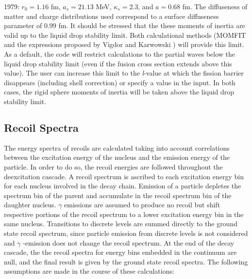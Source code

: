 1979: $r_{0}=1.16$ fm, $a_{s}=21.13$ MeV, $\kappa_{s}=2.3$, and $a=0.68$ fm.
The diffuseness of matter and charge distributions used correspond to a
surface diffuseness parameter of 0.99 fm. It should be stressed that the
these moments of inertia are valid up to the
liquid drop stability limit. Both calculational methods (MOMFIT and the
expressions proposed by Vigdor and Karwowski \cite{VK}) will provide this
limit. As a default, the code will restrict calculations to the partial
waves below the liquid drop stability limit (even if the fusion cross
section extends above this value). The user can increase this limit to the
\emph{l}-value at which the fission barrier disappears (including shell
correction) or specify a value in the input. In both cases, the rigid
sphere moments of inertia will be taken above the liquid drop stability
limit.

\subsection{Recoil Spectra}

The energy spectra of recoils are calculated taking into account correlations
between the excitation energy of the nucleus and the emission energy of the
particle. In order to do so, the recoil energies are followed throughout the
deexcitation cascade. A recoil spectrum is ascribed to each excitation
energy bin for each nucleus involved in the decay chain. Emission of a
particle depletes the spectrum bin of the parent and accumulate in the
recoil spectrum bin of the daughter nucleus. $\gamma$ emissions are assumed
to produce no recoil but shift respective portions of the recoil spectrum to
a lower excitation energy bin in the same nucleus. Transitions to
discrete levels are summed directly to the ground state recoil spectrum,
since particle emission from discrete levels is not considered and $\gamma$%
-emission does not change the recoil spectrum. At the end of the decay
cascade, the the recoil spectra for energy bins embedded in the continuum are
null, and the final result is given by the ground state recoil spectra. The
following assumptions are made in the course of these calculations:

